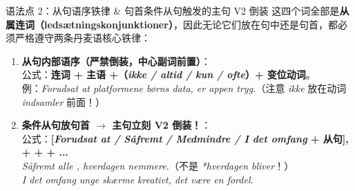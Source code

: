 \begin{grammatikbox}{语法点 2：从句语序铁律 \& 句首条件从句触发的主句 V2 倒装}
这四个词全部是\textbf{从属连词（ledsætningskonjunktioner）}，因此无论它们放在句中还是句首，都必须严格遵守两条丹麦语核心铁律：
\begin{enumerate}
  \item \textbf{从句内部语序（严禁倒装，中心副词前置）}：\\
    公式：\textbf{连词 + 主语 +（\textit{ikke / altid / kun / ofte}）+ 变位动词}。\\
    例：\textit{Forudsat at platformene  børns data, er appen tryg.}（注意 \textit{ikke} 放在动词 \textit{indsamler} 前面！）
  \item \textbf{条件从句放句首 $\rightarrow$ 主句立刻 V2 倒装！}：\\
    公式：\textbf{[\textit{Forudsat at / Såfremt / Medmindre / I det omfang} + 从句], +  +  + ...}\\
     \textit{Såfremt alle ,  hverdagen nemmere.}（不是 \textit{*hverdagen bliver}！）\\
     \textit{I det omfang unge  skærme kreativt,  det være en fordel.}
\end{enumerate}
\end{grammatikbox}

